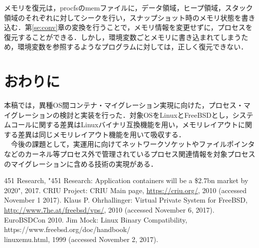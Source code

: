 \documentclass{ipsjpapers}
\begin{document}
メモリを復元は，procfsのmemファイルに，データ領域，ヒープ領域，スタック領域のそれぞれに対してシークを行い，スナップショット時のメモリ状態を書き込む．第\ref{se:conv}章の変換を行うことで，メモリ情報を変更せずに，プロセスを復元することができる．しかし，環境変数ごとメモリに書き込まれてしまうため，環境変数を参照するようなプログラムに対しては，正しく復元できない．

\section{おわりに}
本稿では，異種OS間コンテナ・マイグレーション実現に向けた，プロセス・マイグレーションの検討と実装を行った．対象OSをLinuxとFreeBSDとし，システムコールに関する差異はLinuxバイナリ互換機能を用い，メモリレイアウトに関する差異は同じメモリレイアウト機能を用いて吸収する．\\
　今後の課題として，実運用に向けてネットワークソケットやファイルポインタなどのカーネル等プロセス外で管理されているプロセス関連情報を対象プロセスのマイグレーションに含める技術の実現がある．
\begin{thebibliography}{99}

  	451 Research, "451 Research: Application containers will be a \$2.7bn market by 2020", 2017.
  	CRIU Project: CRIU Main page, \url{https://criu.org/}, 2010 (accessed November 1 2017).
  Klaus P. Ohrhallinger: Virtual Private System for FreeBSD, \url{http://www.7he.at/freebsd/vps/}, 2010 (accessed November 6, 2017). EuroBSDCon 2010.
  Jim Mock: Linux Binary Compatibility, https://www.freebsd.org\slash{}doc\slash{}handbook\slash{}\\linuxemu.html, 1999 (accessed November 2, 2017).
\end{thebibliography}
\end{document}
